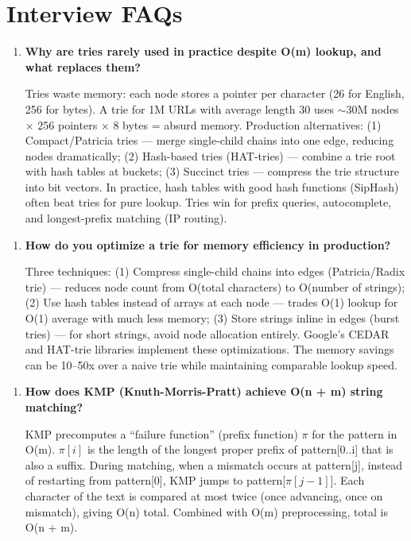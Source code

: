 \section{Interview FAQs}

\begin{enumerate}
\item \textbf{Why are tries rarely used in practice despite O(m) lookup, and what replaces them?}

Tries waste memory: each node stores a pointer per character (26 for English, 256 for bytes). A trie for 1M URLs with average length 30 uses $\sim$30M nodes $\times$ 256 pointers $\times$ 8 bytes = absurd memory. Production alternatives: (1) Compact/Patricia tries --- merge single-child chains into one edge, reducing nodes dramatically; (2) Hash-based tries (HAT-tries) --- combine a trie root with hash tables at buckets; (3) Succinct tries --- compress the trie structure into bit vectors. In practice, hash tables with good hash functions (SipHash) often beat tries for pure lookup. Tries win for prefix queries, autocomplete, and longest-prefix matching (IP routing).
\end{enumerate}

\begin{enumerate}
\item \textbf{How do you optimize a trie for memory efficiency in production?}

Three techniques: (1) Compress single-child chains into edges (Patricia/Radix trie) --- reduces node count from O(total characters) to O(number of strings); (2) Use hash tables instead of arrays at each node --- trades O(1) lookup for O(1) average with much less memory; (3) Store strings inline in edges (burst tries) --- for short strings, avoid node allocation entirely. Google's CEDAR and HAT-trie libraries implement these optimizations. The memory savings can be 10--50x over a naive trie while maintaining comparable lookup speed.
\end{enumerate}

\begin{enumerate}
\item \textbf{How does KMP (Knuth-Morris-Pratt) achieve O(n + m) string matching?}

KMP precomputes a ``failure function'' (prefix function) $\pi$ for the pattern in O(m). $\pi[i]$ is the length of the longest proper prefix of pattern[0..i] that is also a suffix. During matching, when a mismatch occurs at pattern[j], instead of restarting from pattern[0], KMP jumps to pattern[$\pi[j-1]$]. Each character of the text is compared at most twice (once advancing, once on mismatch), giving O(n) total. Combined with O(m) preprocessing, total is O(n + m).
\end{enumerate}

